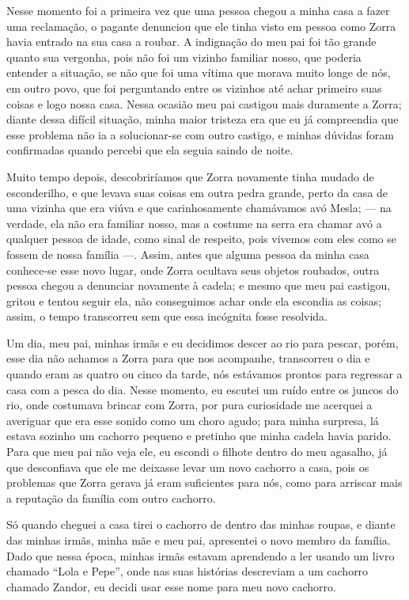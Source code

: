 Nesse momento foi a primeira vez que uma pessoa chegou a minha casa a fazer uma reclamação, o pagante denunciou que ele tinha visto em pessoa como Zorra havia entrado na sua casa a roubar. 
A indignação do meu pai foi tão grande quanto sua vergonha, pois não foi um vizinho familiar nosso, que poderia entender a situação, se não que foi uma vítima que morava muito longe de nós, em outro povo, que foi perguntando entre os vizinhos até achar primeiro suas coisas e logo nossa casa.
Nessa ocasião meu pai castigou mais duramente a Zorra; diante dessa difícil situação, minha maior tristeza era que eu já compreendia que esse problema não ia a solucionar-se com outro castigo, e minhas dúvidas foram confirmadas quando percebi que ela seguia saindo de noite. 

Muito tempo depois, descobriríamos que Zorra novamente tinha mudado de esconderilho, e que levava suas coisas em outra pedra grande, perto da casa de uma vizinha que era viúva e que carinhosamente chamávamos avó Mesla; --- na verdade, ela não era familiar nosso, mas a costume na serra era chamar avó a qualquer pessoa de idade, como sinal de respeito, pois vivemos com eles como se fossem de nossa família ---.
Assim, antes que alguma pessoa da minha casa conhece-se esse novo lugar, onde Zorra ocultava seus objetos roubados, outra pessoa chegou a denunciar novamente à cadela; e mesmo que meu pai castigou, gritou e tentou seguir ela, não conseguimos achar onde ela escondia as coisas; assim, o tempo transcorreu sem que essa incógnita fosse resolvida. 

Um dia, meu pai, minhas irmãs e eu decidimos descer ao rio para pescar, porém, esse dia não achamos a Zorra para que nos acompanhe, transcorreu o dia e quando eram as quatro ou cinco da tarde, nós estávamos prontos para regressar a casa com a pesca do dia. Nesse momento, eu escutei um ruído entre os juncos do rio, onde costumava brincar com Zorra, por pura curiosidade me acerquei a averiguar que era esse sonido como um choro agudo; para minha surpresa, lá estava sozinho um cachorro pequeno e pretinho que minha cadela havia parido.  
Para que meu pai não veja ele, eu escondi o filhote dentro do meu agasalho, já que desconfiava que ele me deixasse levar um novo cachorro a casa, pois os problemas que Zorra gerava já eram suficientes para nós, como para arriscar mais a reputação da família com outro cachorro.


Só quando cheguei a casa tirei o cachorro de dentro das minhas roupas, e diante das minhas irmãs, minha mãe e meu pai, apresentei o novo membro da família. Dado que nessa época, minhas irmãs estavam aprendendo a ler usando um livro chamado ``Lola e Pepe'', onde nas suas histórias descreviam a um cachorro chamado Zandor, eu decidi usar esse nome para meu novo cachorro. 

